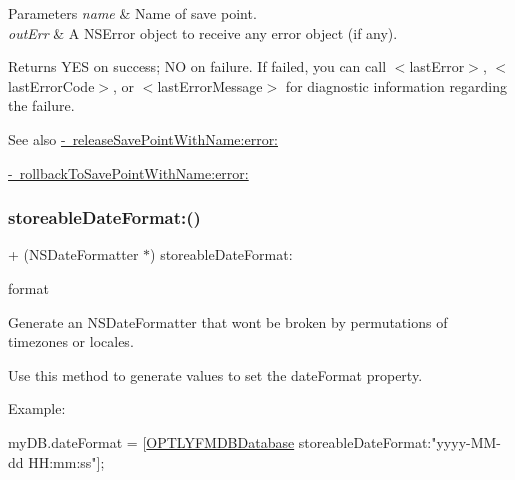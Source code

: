 \begin{DoxyParams}{Parameters}
{\em name} & Name of save point.\\
\hline
{\em out\+Err} & A {\ttfamily N\+S\+Error} object to receive any error object (if any).\\
\hline
\end{DoxyParams}
\begin{DoxyReturn}{Returns}
{\ttfamily Y\+ES} on success; {\ttfamily NO} on failure. If failed, you can call {\ttfamily $<$last\+Error$>$}, {\ttfamily $<$last\+Error\+Code$>$}, or {\ttfamily $<$last\+Error\+Message$>$} for diagnostic information regarding the failure.
\end{DoxyReturn}
\begin{DoxySeeAlso}{See also}
\mbox{\hyperlink{interface_o_p_t_l_y_f_m_d_b_database_afb6f13df41c3e8e1813a00f6d1ec0428}{-\/ release\+Save\+Point\+With\+Name\+:error\+:}} 

\mbox{\hyperlink{interface_o_p_t_l_y_f_m_d_b_database_a8ae3bd5f48fed1f09b14328fc777dab5}{-\/ rollback\+To\+Save\+Point\+With\+Name\+:error\+:}} 
\end{DoxySeeAlso}
\mbox{\label{interface_o_p_t_l_y_f_m_d_b_database_acb3eef48cd21dcb11407b88dac662c57}} 
\subsubsection{\texorpdfstring{storeable\+Date\+Format\+:()}{storeableDateFormat:()}}
{\footnotesize\ttfamily + (N\+S\+Date\+Formatter $\ast$) storeable\+Date\+Format\+: \begin{DoxyParamCaption}\item[{(N\+S\+String $\ast$)}]{format }\end{DoxyParamCaption}}

Generate an {\ttfamily N\+S\+Date\+Formatter} that won\textquotesingle{}t be broken by permutations of timezones or locales.

Use this method to generate values to set the date\+Format property.

Example\+:

my\+D\+B.\+date\+Format = \mbox{[}\mbox{\hyperlink{interface_o_p_t_l_y_f_m_d_b_database}{O\+P\+T\+L\+Y\+F\+M\+D\+B\+Database}} storeable\+Date\+Format\+:"yyyy-\/\+M\+M-\/dd H\+H\+:mm\+:ss"\mbox{]};


